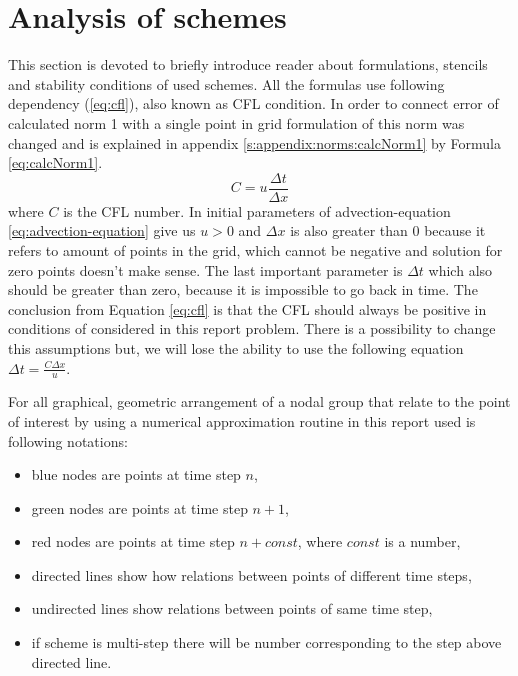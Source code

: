 \section{Analysis of schemes} \label{s:general-approach:analysis-of-the-schemes}

	This section is devoted to briefly introduce reader about formulations, \gls{stencil}s and stability conditions of used schemes. All the formulas use following dependency (\ref{eq:cfl}), also known as \gls{CFL} condition. In order to connect error of calculated norm 1 with a single point in grid formulation of this norm was changed and is explained in appendix \ref{s:appendix:norms:calcNorm1} by Formula \eqref{eq:calcNorm1}.	
	\begin{equation} \label{eq:cfl}
	C = u \frac{\Delta t}{\Delta x}
	\end{equation} 	
	where $C$ is the \gls{CFL} number. In initial parameters of \gls{advection-equation} \eqref{eq:advection-equation} give us $u > 0$ and $\Delta x$ is also greater than $0$ because it refers to amount of points in the grid, which cannot be negative and solution for zero points doesn't make sense. The last important parameter is $\Delta t$ which also should be greater than zero, because it is impossible to go back in time. The conclusion from Equation \eqref{eq:cfl} is that the \gls{CFL} should always be positive in conditions of considered in this report problem. There is a possibility to change this assumptions but, we will lose the ability to use the following equation $\Delta t = \frac{C\Delta x}{u}$.
	
	For all graphical, geometric arrangement of a nodal group that relate to the point of interest by using a numerical approximation routine in this report used is following notations:
	
	\begin{itemize}
		\item blue nodes are points at time step $n$,
		\item green nodes are points at time step $n+1$,
		\item red nodes are points at time step $n+const$, where $const$ is a number,
		\item directed lines show how relations between points of different time steps,
		\item undirected lines show relations between points of same time step,
		\item if scheme is multi-step there will be number corresponding to the step above directed line.
	\end{itemize}



